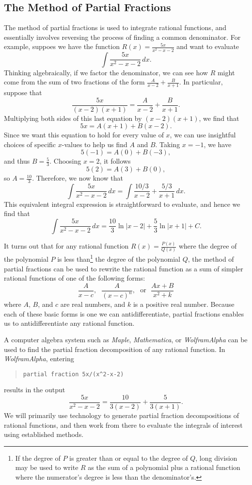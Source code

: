 

\subsection*{The Method of Partial Fractions} 

\nin The method of partial fractions is used to integrate rational functions, and essentially involves reversing the process of finding a common denominator.  For example, suppoes we have the function $R(x) = \frac{5x}{x^2 - x - 2}$ and want to evaluate
$$\int \frac{5x}{x^2-x-2} \, dx.$$
Thinking algebraically, if we factor the denominator, we can see how $R$ might come from the sum of two fractions of the form $\frac{A}{x-2} + \frac{B}{x+1}.$  In particular, suppose that
$$\frac{5x}{(x-2)(x+1)} = \frac{A}{x-2} + \frac{B}{x+1}.$$
Multiplying both sides of this last equation by $(x-2)(x+1)$, we find that
$$5x = A(x+1) + B(x-2).$$
Since we want this equation to hold for every value of $x$, we can use insightful choices of specific $x$-values to help us find $A$ and $B$.  Taking $x = -1$, we have
$$5(-1) = A(0) + B(-3),$$
and thus $B = \frac{5}{3}$.  Choosing $x = 2$, it follows
$$5(2) = A(3) + B(0),$$
so $A = \frac{10}{3}.$
Therefore, we now know that 
$$\int \frac{5x}{x^2-x-2} \, dx = \int \frac{10/3}{x-2} + \frac{5/3}{x+1} \, dx.$$
This equivalent integral expression is straightforward to evaluate, and hence we find that
$$\int \frac{5x}{x^2-x-2} \, dx = \frac{10}{3} \ln|x-2| + \frac{5}{3}\ln|x+1| + C.$$

\nin It turns out that for any rational function $R(x) = \frac{P(x)}{Q(x)}$ where the degree of the polynomial $P$ is less than\footnote{If the degree of $P$ is greater than or equal to the degree of $Q$, long division may be used to write $R$ as the sum of a polynomial plus a rational function where the numerator's degree is less than the denominator's.} the degree of the polynomial $Q$, the method of partial fractions can be used to rewrite the rational function as a sum of simpler rational functions of one of the following forms:
$$\frac{A}{x-c}, \ \ \ \frac{A}{(x-c)^n}, \ \ \ \mbox{or} \ \ \ \frac{Ax+B}{x^2 + k}$$
where $A$, $B$, and $c$ are real numbers, and $k$ is a positive real number.  Because each of these basic forms is one we can antidifferentiate, partial fractions enables us to antidifferentiate any rational function.

\nin A computer algebra system such as \emph{Maple}, \emph{Mathematica}, or \emph{WolframAlpha} can be used to find the partial fraction decomposition of any rational function.  In \emph{WolframAlpha}, entering 
\begin{quote}
\texttt{partial fraction 5x/(x\^{}2-x-2)}
\end{quote}
results in the output
$$\frac{5x}{x^2-x-2} = \frac{10}{3(x-2)} + \frac{5}{3(x+1)}.$$
We will primarily use technology to generate partial fraction decompositions of rational functions, and then work from there to evaluate the integrals of interest using established methods.

